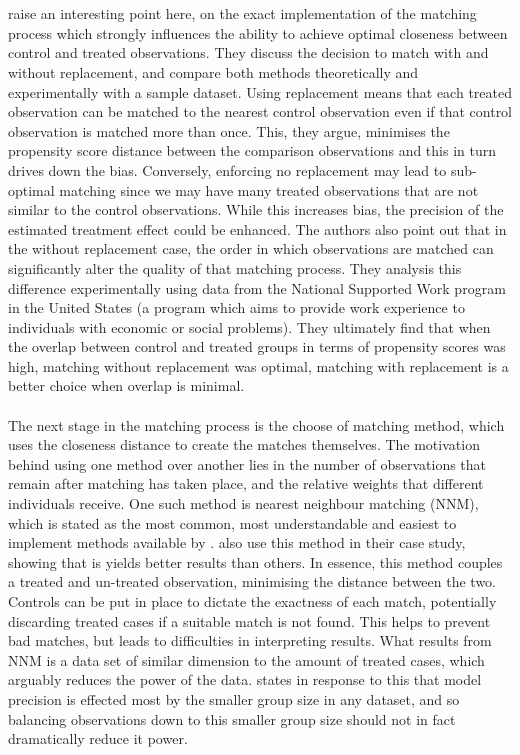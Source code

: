 {{\\\\
\cite{dehejiaPSM} raise an interesting point here, on the exact implementation of the matching process which strongly influences the ability to achieve optimal closeness between control and treated observations. They discuss the decision to match with and without replacement, and compare both methods theoretically and experimentally with a sample dataset. Using replacement means that each treated observation can be matched to the nearest control observation even if that control observation is matched more than once. This, they argue, minimises the propensity score distance between the comparison observations and this in turn drives down the bias. Conversely, enforcing no replacement may lead to sub-optimal matching since we may have many treated observations that are not similar to the control observations. While this increases bias, the precision of the estimated treatment effect could be enhanced. The authors also point out that in the without replacement case, the order in which observations are matched can significantly alter the quality of that matching process. They analysis this difference experimentally using data from the National Supported Work program in the United States (a program which aims to provide work experience to individuals with economic or social problems). They ultimately find that when the overlap between control and treated groups in terms of propensity scores was high, matching without replacement was optimal, matching with replacement is a better choice when overlap is minimal. 
\\\\
The next stage in the matching process is the choose of matching method, which uses the closeness distance to create the matches themselves. The motivation behind using one method over another lies in the number of observations that remain after matching has taken place, and the relative weights that different individuals receive. One such method is nearest neighbour matching (NNM), which is stated as the most common, most understandable and easiest to implement methods available by \cite{stuart2010matching}. \cite{dehejiaPSM} also use this method in their case study, showing that is yields better results than others. In essence, this method couples a treated and un-treated observation, minimising the distance between the two. Controls can be put in place to dictate the exactness of each match, potentially discarding treated cases if a suitable match is not found. This helps to prevent bad matches, but leads to difficulties in interpreting results. What results from NNM is a data set of similar dimension to the amount of treated cases, which arguably reduces the power of the data. \cite{stuart2010matching} states in response to this that model precision is effected most by the smaller group size in any dataset, and so balancing observations down to this smaller group size should not in fact dramatically reduce it power. 
}}
